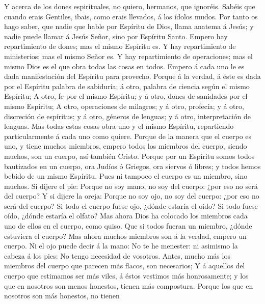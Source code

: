  Y acerca de los dones espirituales, no quiero, hermanos,
que ignoréis.  Sabéis que cuando erais Gentiles, ibais, como
erais llevados, á los ídolos mudos.  Por tanto os hago
saber, que nadie que hable por Espíritu de Dios, llama anatema á Jesús;
y nadie puede llamar á Jesús Señor, sino por Espíritu Santo.
 Empero hay repartimiento de dones; mas el mismo Espíritu
es.  Y hay repartimiento de ministerios; mas el mismo Señor
es.  Y hay repartimiento de operaciones; mas el mismo Dios
es el que obra todas las cosas en todos.  Empero á cada uno
le es dada manifestación del Espíritu para provecho.  Porque
á la verdad, á éste es dada por el Espíritu palabra de sabiduría; á
otro, palabra de ciencia según el mismo Espíritu;  A otro,
fe por el mismo Espíritu; y á otro, dones de sanidades por el mismo
Espíritu;  A otro, operaciones de milagros; y á otro,
profecía; y á otro, discreción de espíritus; y á otro, géneros de
lenguas; y á otro, interpretación de lenguas.  Mas todas
estas cosas obra uno y el mismo Espíritu, repartiendo particularmente á
cada uno como quiere.  Porque de la manera que el cuerpo es
uno, y tiene muchos miembros, empero todos los miembros del cuerpo,
siendo muchos, son un cuerpo, así también Cristo.  Porque
por un Espíritu somos todos bautizados en un cuerpo, ora Judíos ó
Griegos, ora siervos ó libres; y todos hemos bebido de un mismo
Espíritu.  Pues ni tampoco el cuerpo es un miembro, sino
muchos.  Si dijere el pie: Porque no soy mano, no soy del
cuerpo: ¿por eso no será del cuerpo?  Y si dijere la oreja:
Porque no soy ojo, no soy del cuerpo: ¿por eso no será del cuerpo?
 Si todo el cuerpo fuese ojo, ¿dónde estaría el oído? Si
todo fuese oído, ¿dónde estaría el olfato?  Mas ahora Dios
ha colocado los miembros cada uno de ellos en el cuerpo, como quiso.
 Que si todos fueran un miembro, ¿dónde estuviera el
cuerpo?  Mas ahora muchos miembros son á la verdad, empero
un cuerpo.  Ni el ojo puede decir á la mano: No te he
menester: ni asimismo la cabeza á los pies: No tengo necesidad de
vosotros.  Antes, mucho más los miembros del cuerpo que
parecen más flacos, son necesarios;  Y á aquellos del
cuerpo que estimamos ser más viles, á éstos vestimos más honrosamente; y
los que en nosotros son menos honestos, tienen más compostura.
 Porque los que en nosotros son más honestos, no tienen
